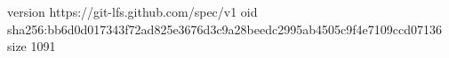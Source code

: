 version https://git-lfs.github.com/spec/v1
oid sha256:bb6d0d017343f72ad825e3676d3c9a28beedc2995ab4505c9f4e7109ccd07136
size 1091
